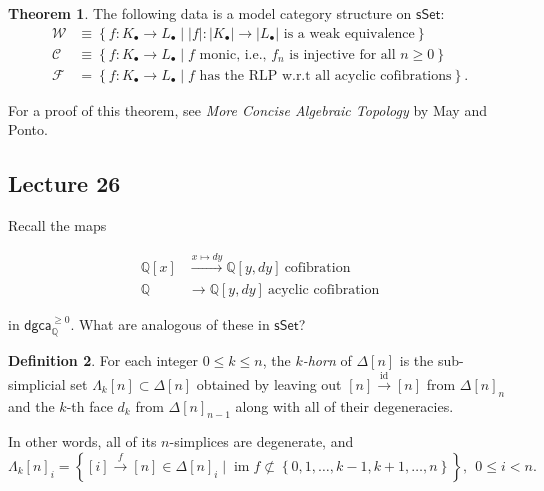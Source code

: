 \documentclass[10pt,letterpaper,cm]{nupset}
\theoremstyle{definition}
\newtheorem{defn}{Definition}[subsection]
\theoremstyle{theorem}
\newtheorem{theorem}[defn]{Theorem}
\theoremstyle{remark}
\newcommand{\Q}{\mathbb Q}
\newcommand{\1}{\mathbb{1}}
\newcommand{\cf}{\mathscr{C}}
\newcommand{\f}{\mathscr{F}}
\newcommand{\w}{\mathscr{W}}
\newcommand{\dgca}{\mathsf{dgca}}
\newcommand{\0}{\vec 0}
\DeclareMathOperator{\id}{id}
\DeclareMathOperator{\im}{im}
\begin{document}
\bigskip



\begin{theorem}
The following data is a model category structure on $\mathsf{sSet}$:
\begin{align*}
\w & \equiv \left\{f : K_{\bullet} \to L_{\bullet} \mid \left\lvert{f}\right\rvert : \text{$\left\lvert{K_{\bullet}}\right\rvert \to \left\lvert{L_{\bullet}}\right\rvert$ is a weak equivalence}\right\}
\\ \cf & \equiv \left\{f : K_{\bullet} \to L_{\bullet} \mid \text{$f$ monic, i.e., $f_n$ is injective for all $n\geq 0$}\right\}
\\ \f & = \left\{f : K_{\bullet} \to L_{\bullet} \mid \text{$f$ has the RLP w.r.t all acyclic cofibrations}\right\}
.\end{align*}
\end{theorem}

For a proof of this theorem, see \textit{More Concise Algebraic Topology} by May and Ponto.

\subsection{Lecture 26}

Recall the maps

\begin{align*}
\Q\left[x\right] &  \xrightarrow{x \mapsto d{y}} \Q\left[y, d{y}\right] \  \text{cofibration}
\\ \Q & \longrightarrow \Q\left[y, d{y}\right] \ \text{acyclic cofibration}
\end{align*}

in $\dgca_{\Q}^{\geq 0}$. What are analogous of these in $\mathsf{sSet}$?

\begin{defn}
For each integer $0 \leq k \leq n$, the \textit{$k$-horn}  of $\Delta\left[n\right]$ is the sub-simplicial set $\Lambda_k\left[n\right]\subset \Delta\left[n\right]$ obtained  by leaving out $\left[n\right] \xrightarrow{\id} \left[n\right]$ from $\Delta\left[n\right]_n$ and the $k$-th face $d_k$ from $\Delta\left[n\right]_{n-1}$ along with all of their degeneracies. 
\end{defn}

In other words, all of its $n$-simplices are degenerate, and 
\[
\Lambda_k\left[n\right]_i = \left\{ \left[ i \right] \xrightarrow{f} \left[n\right] \in \Delta\left[n\right]_i \mid \im{f} \not\subset \left\{0,1,\ldots, k-1, k+1, \ldots, n\right\} \right\}, \ \  0 \leq i < n.
\]
\end{document}
